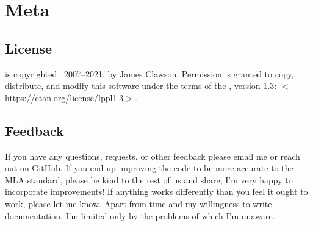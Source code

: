 \documentclass{ltxdockit}
\newcommand*{\biblatexmla}{\sty{biblatex-mla}\xspace}
\newcommand*{\mylink}[1]{$<$\url{#1}$>$}
\newcommand*{\mla}{MLA\xspace}
\begin{document}

\section{Meta}
\subsection{License}

\biblatexmla is copyrighted \textcopyright\ 2007--2021, by James Clawson. Permission is granted to copy, distribute, and modify this software under the terms of the \lppl, version 1.3: \mylink{https://ctan.org/license/lppl1.3}.

\subsection[Feedback]{Feedback}
\label{int:feb}

If you have any questions, requests, or other feedback please email me or reach out on GitHub. If you end up improving the code to be more accurate to the \mla{} standard, please be kind to the rest of us and share; I'm very happy to incorporate improvements! If anything works differently than you feel it ought to work, please let me know. Apart from time and my willingness to write documentation, I'm limited only by the problems of which I'm unaware.
\end{document}
